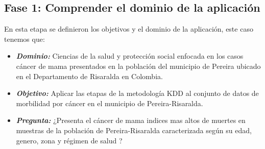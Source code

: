 \subsection{Fase 1: Comprender el dominio de la aplicación}
En esta etapa se definieron los objetivos y el dominio de la aplicación, este caso tenemos que:

\begin{itemize}[label=\HandRight]
	\item \textit{\textbf{Dominio:}} Ciencias de la salud y protección social enfocada en los casos cáncer de mama presentados en la población del municipio de Pereira ubicado en el Departamento de Risaralda en Colombia.\\
	\item \textit{\textbf{Objetivo:}} Aplicar las etapas de la metodología KDD al conjunto de datos de morbilidad por cáncer en el municipio de Pereira-Risaralda.\\
	\item \textit{\textbf{Pregunta:}} ¿Presenta el cáncer de mama indices mas altos de muertes en muestras de la población de Pereira-Risaralda caracterizada según su edad, genero, zona y régimen de salud ?
\end{itemize}
